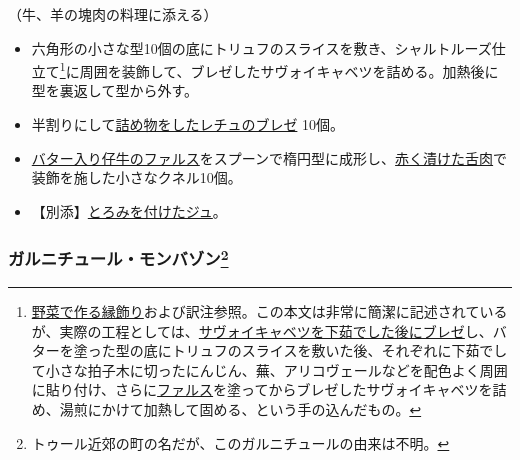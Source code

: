 \begin{recette}


（牛、羊の塊肉の料理に添える）

\begin{itemize}
\item
  六角形の小さな型10個の底にトリュフのスライスを敷き、シャルトルーズ仕立て\footnote{\protect\hyperlink{bordures-en-legumes}{野菜で作る縁飾り}および訳注参照。この本文は非常に簡潔に記述されているが、実際の工程としては、\protect\hyperlink{chou-braise}{サヴォイキャベツを下茹でした後にブレゼ}し、バターを塗った型の底にトリュフのスライスを敷いた後、それぞれに下茹でして小さな拍子木に切ったにんじん、蕪、アリコヴェールなどを配色よく周囲に貼り付け、さらに\protect\hyperlink{farce-a}{ファルス}を塗ってからブレゼしたサヴォイキャベツを詰め、湯煎にかけて加熱して固める、という手の込んだもの。}に周囲を装飾して、ブレゼしたサヴォイキャベツを詰める。加熱後に型を裏返して型から外す。
\item
  半割りにして\protect\hyperlink{laitues-farcies-pour-garniture}{詰め物をしたレチュのブレゼ}
  10個。
\item
  \protect\hyperlink{farce-b}{バター入り仔牛のファルス}をスプーンで楕円型に成形し、\protect\hyperlink{saumure-liquide-pour-langues}{赤く漬けた舌肉}で装飾を施した小さなクネル10個。
\item
  【別添】\protect\hyperlink{jus-de-veau-lie}{とろみを付けたジュ}。
\end{itemize}

\atoaki{}

\hypertarget{garniture-montbazon}{%
\subsubsection[ガルニチュール・モンバゾン]{\texorpdfstring{ガルニチュール・モンバゾン\footnote{トゥール近郊の町の名だが、このガルニチュールの由来は不明。}}{ガルニチュール・モンバゾン}}\label{garniture-montbazon}}




\end{recette}
